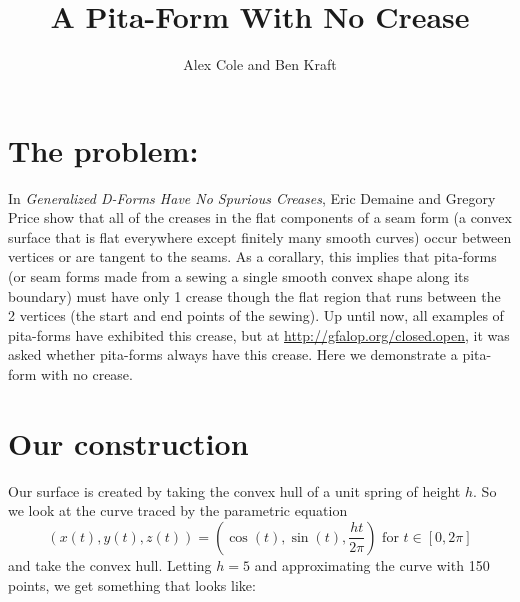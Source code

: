 \documentclass[12pt]{article}
\title{A Pita-Form With No Crease}
\author{Alex Cole and Ben Kraft}
\begin{document}
\maketitle

\section{The problem:}
In \textit{Generalized D-Forms Have No Spurious Creases}, Eric Demaine and Gregory Price show that all of the creases in the flat components of a seam form (a convex surface that is flat everywhere except finitely many smooth curves) occur between vertices or are tangent to the seams. As a corallary, this implies that pita-forms (or seam forms made from a sewing a single smooth convex shape along its boundary) must have only 1 crease though the flat region that runs between the 2 vertices (the start and end points of the sewing). Up until now, all examples of pita-forms have exhibited this crease, but at \url{http://gfalop.org/closed.open}, it was asked whether pita-forms always have this crease. Here we demonstrate a pita-form with no crease.

\section{Our construction}
Our surface is created by taking the convex hull of a unit spring of height $h$. So we look at the curve traced by the parametric equation 
$$(x(t), y(t), z(t)) = \left(\cos(t), \sin(t), \frac{ht}{2\pi} \right) \text{ for } t \in [0, 2\pi]$$
and take the convex hull. Letting $h=5$ and approximating the curve with 150 points, we get something that looks like:
\end{document}
